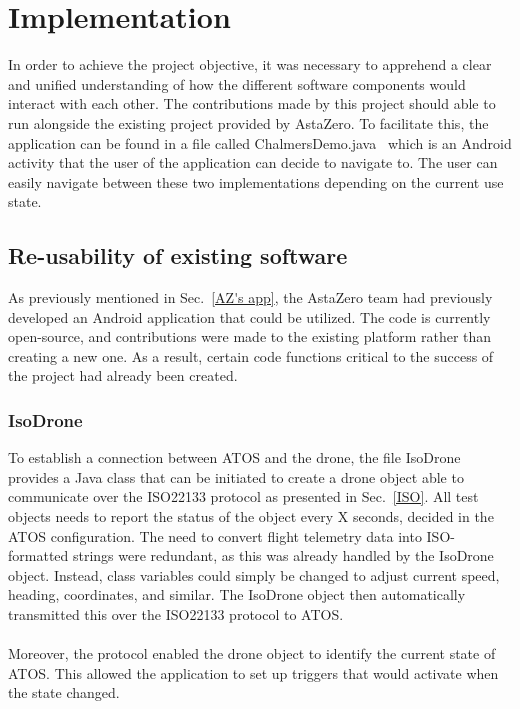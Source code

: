 \chapter{Implementation}
In order to achieve the project objective, it was necessary to apprehend a clear and unified understanding of how the different software components would interact with each other. The contributions made by this project should able to run alongside the existing project provided by AstaZero. To facilitate this, the application can be found in a file called ChalmersDemo.java~\cite{azGithubMobil} which is an Android activity that the user of the application can decide to navigate to. The user can easily navigate between these two implementations depending on the current use state. 

\section{Re-usability of existing software}
As previously mentioned in Sec.~\ref{AZ's app}, the AstaZero team had previously developed an Android application that could be utilized. The code is currently open-source, and contributions were made to the existing platform rather than creating a new one. As a result, certain code functions critical to the success of the project had already been created.

\subsection{IsoDrone}
To establish a connection between ATOS and the drone, the file IsoDrone~\cite{azGithubMobil} provides a Java class that can be initiated to create a drone object able to communicate over the ISO22133 protocol as presented in Sec.~\ref{ISO}. All test objects needs to report the status of the object every X seconds, decided in the ATOS configuration. The need to convert flight telemetry data into ISO-formatted strings were redundant, as this was already handled by the IsoDrone object. Instead, class variables could simply be changed to adjust current speed, heading, coordinates, and similar. The IsoDrone object then automatically transmitted this over the ISO22133 protocol to ATOS. 
\\ \\
Moreover, the protocol enabled the drone object to identify the current state of ATOS. This allowed the application to set up triggers that would activate when the state changed.


